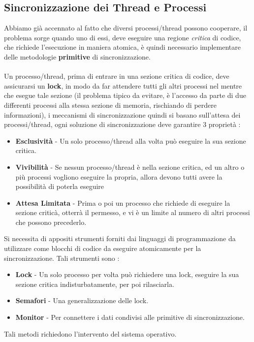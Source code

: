 \documentclass[12pt, letterpaper]{article}
\newcommand{\acc}{\\\hphantom{}\\}
\begin{document}
\subsection{Sincronizzazione dei Thread e Processi}
Abbiamo già accennato al fatto che diversi processi/thread possono cooperare, il problema sorge quando uno di essi, deve 
eseguire una regione \textit{critica} di codice, che richiede l'esecuzione in maniera atomica, è quindi necessario 
implementare delle metodologie \textbf{primitive} di sincronizzazione.\acc 
Un processo/thread, prima di entrare in una sezione critica di codice, deve assicurarsi un 
\textbf{lock}, in modo da far attendere tutti gli altri processi nel mentre che esegue tale sezione (il problema tipico da 
evitare, è l'accesso da parte di due differenti processi alla stessa sezione di memoria, rischiando di perdere informazioni), 
i meccanismi di sincronizzazione quindi si basano sull'attesa dei processi/thread, ogni soluzione di 
sincronizzazione deve garantire 3 proprietà : \begin{itemize}
    \item \textbf{Esclusività} - Un solo processo/thread alla volta può eseguire la sua sezione critica.
    \item \textbf{Vivibilità} - Se nessun processo/thread è nella sezione critica, ed un altro o più processi vogliono eseguire la propria, 
    allora devono tutti avere la possibilità di poterla eseguire 
    \item \textbf{Attesa Limitata} - Prima o poi un processo che richiede di eseguire la sezione criticà, otterrà il permesso, 
     e vi è un limite al numero di altri processi che possono precederlo.
\end{itemize}
Si necessita di appositi strumenti forniti dai linguaggi di programmazione da utilizzare come 
blocchi di codice da eseguire atomicamente per la sincronizzazione. Tali strumenti sono : \begin{itemize}
    \item \textbf{Lock} - Un solo processo per volta può richiedere una lock, eseguire la sua sezione critica 
    indisturbatamente, per poi rilasciarla. 
    \item \textbf{Semafori} - Una generalizzazione delle lock. 
    \item \textbf{Monitor} - Per connettere i dati condivisi alle primitive di sincronizzazione.
\end{itemize}
Tali metodi richiedono l'intervento del sistema operativo. 
\end{document}
